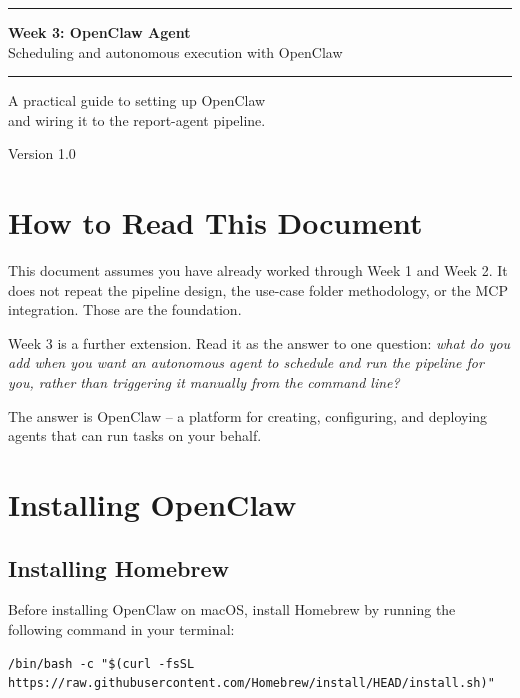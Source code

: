 \documentclass[12pt, a4paper]{article}
\begin{document}
\begin{titlepage}
\centering
\vspace*{3cm}
{\color{primary}\rule{\linewidth}{2pt}}
\vspace{1cm}

{\Huge\bfseries\color{darktext} Week 3: OpenClaw Agent}\\[0.5em]
{\Large\color{mutedtext} Scheduling and autonomous execution with OpenClaw}

\vspace{1cm}
{\color{primary}\rule{\linewidth}{2pt}}

\vspace{2cm}
{\large\color{mutedtext}
  A practical guide to setting up OpenClaw\\
  and wiring it to the report-agent pipeline.
}

\vfill
{\small\color{mutedtext} Version 1.0}
\end{titlepage}

\tableofcontents
\newpage

\section{How to Read This Document}

This document assumes you have already worked through Week 1 and Week 2. It does not repeat the pipeline design, the use-case folder methodology, or the MCP integration. Those are the foundation.

Week 3 is a further extension. Read it as the answer to one question: \textit{what do you add when you want an autonomous agent to schedule and run the pipeline for you, rather than triggering it manually from the command line?}

The answer is OpenClaw -- a platform for creating, configuring, and deploying agents that can run tasks on your behalf.

\section{Installing OpenClaw}

\subsection{Installing Homebrew}

Before installing OpenClaw on macOS, install Homebrew by running the following command in your terminal:

\begin{lstlisting}[style=shellstyle]
/bin/bash -c "$(curl -fsSL https://raw.githubusercontent.com/Homebrew/install/HEAD/install.sh)"
\end{lstlisting}
\end{document}
